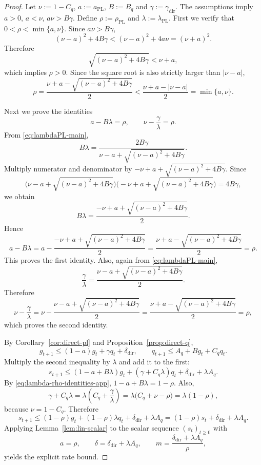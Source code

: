 \documentclass{article}
\theoremstyle{definition}
\begin{document}
\begin{proof}
Let $
\nu:=1-C_q$,
$a:=a_{\mathrm{PL}}$,
$B:=B_q$ and
$\gamma:=\gamma_{\mathrm{dir}}$.
The assumptions imply $
a>0$, $
a<\nu$,
$a\nu>B\gamma$.
Define $\rho:=\rho_{\mathrm{PL}}$ and
$\lambda:=\lambda_{\mathrm{PL}}$.
First we verify that $0<\rho<\min\{a,\nu\}$. Since $a\nu>B\gamma$,
\[
(\nu-a)^2+4B\gamma
<
(\nu-a)^2+4a\nu
=
(\nu+a)^2.
\]
Therefore
\[
\sqrt{(\nu-a)^2+4B\gamma}<\nu+a,
\]
which implies $\rho>0$. Since the square root is also strictly larger than
$|\nu-a|$,
\[
\rho
=
\frac{\nu+a-\sqrt{(\nu-a)^2+4B\gamma}}{2}
<
\frac{\nu+a-|\nu-a|}{2}
=
\min\{a,\nu\}.
\]

Next we prove the identities
\begin{equation}
a-B\lambda=\rho,
\qquad
\nu-\frac{\gamma}{\lambda}=\rho.
\label{eq:lambda-rho-identities-app}\end{equation}
From \eqref{eq:lambdaPL-main},
\[
B\lambda
=
\frac{2B\gamma}{\nu-a+\sqrt{(\nu-a)^2+4B\gamma}}.
\]
Multiply numerator and denominator by
$-\nu+a+\sqrt{(\nu-a)^2+4B\gamma}$. Since
\[
\bigl(\nu-a+\sqrt{(\nu-a)^2+4B\gamma}\bigr)
\bigl(-\nu+a+\sqrt{(\nu-a)^2+4B\gamma}\bigr)
=
4B\gamma,
\]
we obtain
\[
B\lambda
=
\frac{-\nu+a+\sqrt{(\nu-a)^2+4B\gamma}}{2}.
\]
Hence
\[
a-B\lambda
=
a-\frac{-\nu+a+\sqrt{(\nu-a)^2+4B\gamma}}{2}
=
\frac{\nu+a-\sqrt{(\nu-a)^2+4B\gamma}}{2}
=
\rho.
\]
This proves the first identity. Also, again from \eqref{eq:lambdaPL-main},
\[
\frac{\gamma}{\lambda}
=
\frac{\nu-a+\sqrt{(\nu-a)^2+4B\gamma}}{2}.
\]
Therefore
\[
\nu-\frac{\gamma}{\lambda}
=
\nu-\frac{\nu-a+\sqrt{(\nu-a)^2+4B\gamma}}{2}
=
\frac{\nu+a-\sqrt{(\nu-a)^2+4B\gamma}}{2}
=
\rho,
\]
which proves the second identity.

By Corollary~\ref{cor:direct-pl} and Proposition~\ref{prop:direct-q},
\[
g_{t+1}\le (1-a)g_t+\gamma q_t+\delta_{\mathrm{dir}},
\qquad
q_{t+1}\le A_q+B g_t+C_q q_t.
\]
Multiply the second inequality by $\lambda$ and add it to the first:
\[
s_{t+1}
\le
(1-a+B\lambda)g_t+(\gamma+C_q\lambda)q_t+\delta_{\mathrm{dir}}+\lambda A_q.
\]
By \eqref{eq:lambda-rho-identities-app}, $1-a+B\lambda=1-\rho$.
Also,
\[
\gamma+C_q\lambda
=
\lambda\left(C_q+\frac{\gamma}{\lambda}\right)
=
\lambda\bigl(C_q+\nu-\rho\bigr)
=
\lambda(1-\rho),
\]
because $\nu=1-C_q$. Therefore
\[
s_{t+1}
\le
(1-\rho)g_t+(1-\rho)\lambda q_t+\delta_{\mathrm{dir}}+\lambda A_q
=
(1-\rho)s_t+\delta_{\mathrm{dir}}+\lambda A_q.
\]
Applying Lemma~\ref{lem:lin-scalar} to the scalar sequence $(s_t)_{t\ge 0}$
with
\[
a=\rho,
\qquad
\delta=\delta_{\mathrm{dir}}+\lambda A_q,
\qquad
m=\frac{\delta_{\mathrm{dir}}+\lambda A_q}{\rho},
\]
yields the explicit rate bound.
\end{proof}
\end{document}
